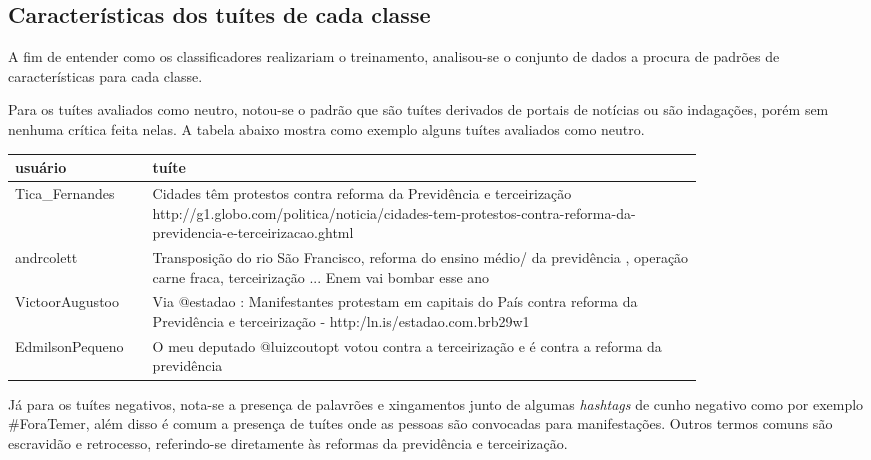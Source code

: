 \subsection{Características dos tuítes de cada classe}

A fim de entender como os classificadores realizariam o treinamento, analisou-se o conjunto de
dados a procura de padrões de características para cada classe.

Para os tuítes avaliados como neutro, notou-se o padrão que são tuítes derivados de portais de 
notícias ou são indagações, porém sem nenhuma crítica feita nelas.
A tabela abaixo mostra como exemplo alguns tuítes avaliados como neutro.

\begin{center}
	\begin{tabular}{| l | p{0.8\linewidth} |}
		\hline
		usuário & tuíte \\
		\hline
		Tica_Fernandes & Cidades têm protestos contra reforma da Previdência e terceirização http://g1.globo.com/politica/noticia/cidades-tem-protestos-contra-reforma-da-previdencia-e-terceirizacao.ghtml \\
		\hline
		andrcolett & Transposição do rio São Francisco, reforma do ensino médio/ da previdência , operação carne fraca, terceirização ... Enem vai bombar esse ano \\
		\hline
		VictoorAugustoo & Via @estadao : Manifestantes protestam em capitais do País contra reforma da Previdência e terceirização - http:/ln.is/estadao.com.brb29w1 \\
		\hline
		EdmilsonPequeno & O meu deputado @luizcoutopt votou contra a terceirização e é contra a reforma da previdência \\
		\hline
	\end{tabular}
\end{center}

Já para os tuítes negativos, nota-se a presença de palavrões e xingamentos 
junto de algumas \textit{hashtags} de cunho negativo como por exemplo \#ForaTemer,
além disso é comum a presença de tuítes onde as pessoas são convocadas para manifestações.
Outros termos comuns são escravidão e retrocesso, referindo-se diretamente às reformas da previdência e terceirização.

